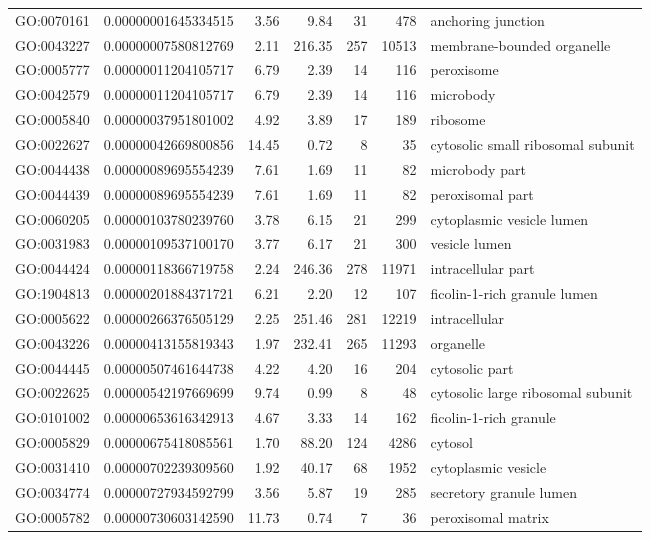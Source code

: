 \documentclass[letterpaper,12pt]{article}
\numberwithin{equation}{appendix}
\begin{document}
\begin{landscape}
{{\begin{longtable}{lrrrrrl}
  GO:0070161 & 0.00000001645334515 & 3.56 & 9.84 & 31 & 478 & anchoring junction \\ 
  GO:0043227 & 0.00000007580812769 & 2.11 & 216.35 & 257 & 10513 & membrane-bounded organelle \\ 
  GO:0005777 & 0.00000011204105717 & 6.79 & 2.39 & 14 & 116 & peroxisome \\ 
  GO:0042579 & 0.00000011204105717 & 6.79 & 2.39 & 14 & 116 & microbody \\ 
  GO:0005840 & 0.00000037951801002 & 4.92 & 3.89 & 17 & 189 & ribosome \\ 
  GO:0022627 & 0.00000042669800856 & 14.45 & 0.72 & 8 & 35 & cytosolic small ribosomal subunit \\ 
  GO:0044438 & 0.00000089695554239 & 7.61 & 1.69 & 11 & 82 & microbody part \\ 
  GO:0044439 & 0.00000089695554239 & 7.61 & 1.69 & 11 & 82 & peroxisomal part \\ 
  GO:0060205 & 0.00000103780239760 & 3.78 & 6.15 & 21 & 299 & cytoplasmic vesicle lumen \\ 
  GO:0031983 & 0.00000109537100170 & 3.77 & 6.17 & 21 & 300 & vesicle lumen \\ 
  GO:0044424 & 0.00000118366719758 & 2.24 & 246.36 & 278 & 11971 & intracellular part \\ 
  GO:1904813 & 0.00000201884371721 & 6.21 & 2.20 & 12 & 107 & ficolin-1-rich granule lumen \\ 
  GO:0005622 & 0.00000266376505129 & 2.25 & 251.46 & 281 & 12219 & intracellular \\ 
  GO:0043226 & 0.00000413155819343 & 1.97 & 232.41 & 265 & 11293 & organelle \\ 
  GO:0044445 & 0.00000507461644738 & 4.22 & 4.20 & 16 & 204 & cytosolic part \\ 
  GO:0022625 & 0.00000542197669699 & 9.74 & 0.99 & 8 & 48 & cytosolic large ribosomal subunit \\ 
  GO:0101002 & 0.00000653616342913 & 4.67 & 3.33 & 14 & 162 & ficolin-1-rich granule \\ 
  GO:0005829 & 0.00000675418085561 & 1.70 & 88.20 & 124 & 4286 & cytosol \\ 
  GO:0031410 & 0.00000702239309560 & 1.92 & 40.17 & 68 & 1952 & cytoplasmic vesicle \\ 
  GO:0034774 & 0.00000727934592799 & 3.56 & 5.87 & 19 & 285 & secretory granule lumen \\ 
  GO:0005782 & 0.00000730603142590 & 11.73 & 0.74 & 7 & 36 & peroxisomal matrix \\ 

\end{longtable}}}
\end{landscape}
\end{document}
